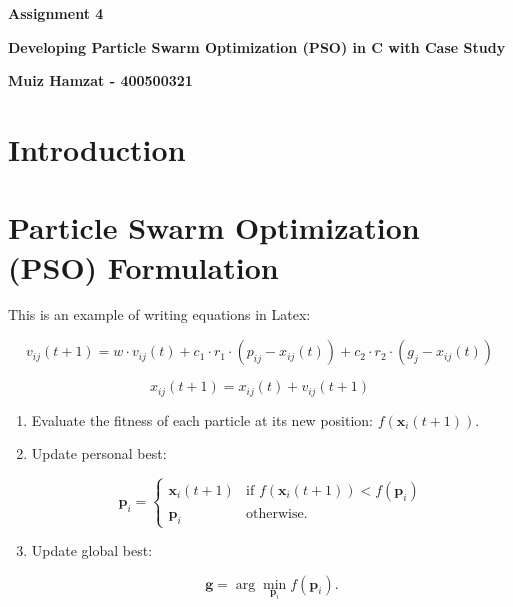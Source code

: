\documentclass[12pt]{article}
\begin{document}
	
	\justifying
	
	\begin{center}
		\textbf{{\large Assignment 4}}
		
		\textbf{Developing Particle Swarm Optimization (PSO) in C with Case Study} 
		
		\textbf{Muiz Hamzat - 400500321}
		
	\end{center}
	

	
	
	
	\section{Introduction}
	
	
	
	
	
	
	
	
	

	
	
	\section{Particle Swarm Optimization (PSO) Formulation}
	
	
	This is an example of writing equations in Latex:
	
	\[
	v_{ij}(t+1) = w \cdot v_{ij}(t) + c_1 \cdot r_1 \cdot (p_{ij} - x_{ij}(t)) + c_2 \cdot r_2 \cdot (g_j - x_{ij}(t))
	\]
	
	
	\[
	x_{ij}(t+1) = x_{ij}(t) + v_{ij}(t+1)
	\]
	
	
	\begin{enumerate}
		\item Evaluate the fitness of each particle at its new position: \(f(\mathbf{x}_i(t+1))\).
		
		\item  Update personal best:
		
		\[
		\mathbf{p}_i = 
		\begin{cases} 
			\mathbf{x}_i(t+1) & \text{if } f(\mathbf{x}_i(t+1)) < f(\mathbf{p}_i) \\
			\mathbf{p}_i & \text{otherwise.}
		\end{cases}
		\]
		
		\item  Update global best:
		
		\[
		\mathbf{g} = \arg\min_{\mathbf{p}_i} f(\mathbf{p}_i).
		\]
	\end{enumerate}
	
\end{document}
